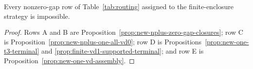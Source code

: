 

\begin{proposition}
\label{prop:finite-enclosure-nonzero-gap-branches}
Every nonzero-gap row of Table~\ref{tab:routing} assigned to the
finite-enclosure strategy is impossible.
\end{proposition}

\begin{proof}
Rows A and B are Proposition~\ref{prop:new-nplus-zero-gap-closures}; row C is
Proposition~\ref{prop:new-nplus-one-all-vd0}; row D is
Propositions~\ref{prop:new-one-t3-terminal} and
\ref{prop:finite-vd1-supported-terminal}; and row E is
Proposition~\ref{prop:new-one-vd-assembly}.
\end{proof}
